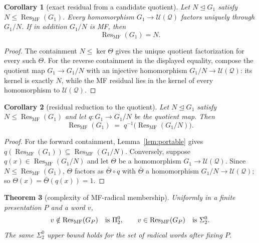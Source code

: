 \documentclass[11pt]{amsart}
\newcommand{\leanverified}[2]{\ignorespaces}
\newtheorem{theorem}{Theorem}[section]
\newtheorem{corollary}[theorem]{Corollary}
\theoremstyle{definition}
\theoremstyle{remark}
\theoremstyle{plain}
\newcommand{\U}{\mathcal U}
\begin{document}
\begin{corollary}[exact residual from a candidate quotient]\label{cor:exactradical}
Let $N\trianglelefteq G_1$ satisfy
$N\le\operatorname{Res}_{\mathrm{MF}}(G_1)$.  Every homomorphism $G_1\to\U(\mathcal Q)$ factors uniquely through $G_1/N$.  If in
addition $G_1/N$ is MF, then
\leanverified{Sofic/ManuscriptExactWrappers}{GroupApproximation.ManuscriptExactWrappers.manuscriptExactRadicalFromCandidateQuotient}
\[
 \operatorname{Res}_{\mathrm{MF}}(G_1)=N.
\]
\end{corollary}

\begin{proof}
The containment $N\le\ker\Theta$ gives the unique quotient
factorization for every such $\Theta$.  For the
reverse containment in the displayed equality, compose the quotient
map $G_1\to G_1/N$ with an injective homomorphism $G_1/N\to\U(\mathcal Q)$:
its kernel is exactly $N$, while the MF residual lies in the kernel of
every homomorphism to $\U(\mathcal Q)$.
\end{proof}

\begin{corollary}[residual reduction to the quotient]\label{cor:pullback}
Let $N\trianglelefteq G_1$ satisfy
$N\le\operatorname{Res}_{\mathrm{MF}}(G_1)$ and let
$q\colon G_1\to G_1/N$ be the quotient map.  Then
\leanverified{Sofic/ManuscriptExactWrappers}{GroupApproximation.ManuscriptExactWrappers.manuscriptRadicalReductionToQuotient}
\[
 \operatorname{Res}_{\mathrm{MF}}(G_1)
 \;=\;
 q^{-1}\bigl(\operatorname{Res}_{\mathrm{MF}}(G_1/N)\bigr).
\]
\end{corollary}

\begin{proof}
For the forward containment, Lemma~\ref{lem:portable} gives
$q(\operatorname{Res}_{\mathrm{MF}}(G_1))
\subseteq\operatorname{Res}_{\mathrm{MF}}(G_1/N)$.  Conversely, suppose
$q(x)\in\operatorname{Res}_{\mathrm{MF}}(G_1/N)$ and let $\Theta$ be
a homomorphism $G_1\to\U(\mathcal Q)$.  Since
$N\le\operatorname{Res}_{\mathrm{MF}}(G_1)$, $\Theta$ factors as
$\bar\Theta\circ q$ with $\bar\Theta$ a homomorphism
$G_1/N\to\U(\mathcal Q)$; so $\Theta(x)=\bar\Theta(q(x))=1$.
\end{proof}

\begin{theorem}[complexity of MF-radical membership]
\label{thm:mf-radical-arithmetic}
Uniformly in a finite presentation $P$ and a word $v$,
\[
 v\notin\operatorname{Res}_{\mathrm{MF}}(G_P)\quad\hbox{is }\Pi^0_2,
 \qquad
 v\in\operatorname{Res}_{\mathrm{MF}}(G_P)\quad\hbox{is }\Sigma^0_2.
\]
The same $\Sigma^0_2$ upper bound holds for the set of radical words after
fixing $P$.
\end{theorem}
\end{document}
